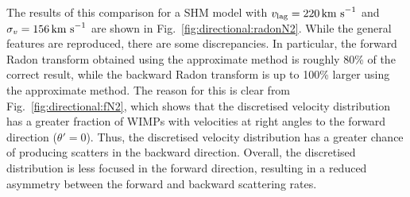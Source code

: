 The results of this comparison for a SHM model with $v_\textrm{lag} = 220 \,\textrm{km s}^{-1}$ and $\sigma_v = 156 \,\textrm{km s}^{-1}$ are shown in Fig.~\ref{fig:directional:radonN2}. While the general features are reproduced, there are some discrepancies. In particular, the forward Radon transform obtained using the approximate method is roughly 80\% of the correct result, while the backward Radon transform is up to 100\% larger using the approximate method. The reason for this is clear from Fig.~\ref{fig:directional:fN2}, which shows that the discretised velocity distribution has a greater fraction of WIMPs with velocities at right angles to the forward direction ($\theta' = 0$). Thus, the discretised velocity distribution has a greater chance of producing scatters in the backward direction. Overall, the discretised distribution is less focused in the forward direction, resulting in a reduced asymmetry between the forward and backward scattering rates. 

